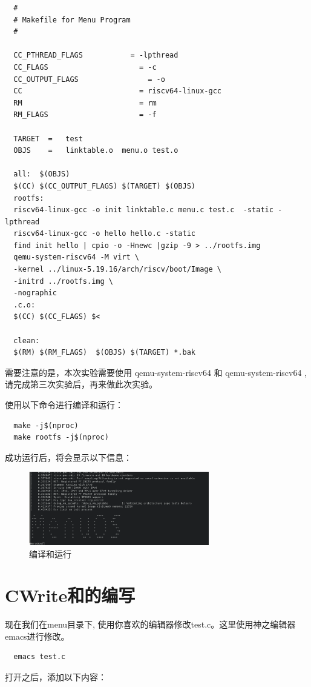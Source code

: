 \documentclass[lang=cn,10pt]{elegantbook}
\begin{document}
\begin{lstlisting}
  #
  # Makefile for Menu Program
  #

  CC_PTHREAD_FLAGS			 = -lpthread
  CC_FLAGS                     = -c 
  CC_OUTPUT_FLAGS				 = -o
  CC                           = riscv64-linux-gcc
  RM                           = rm
  RM_FLAGS                     = -f

  TARGET  =   test
  OBJS    =   linktable.o  menu.o test.o

  all:	$(OBJS)
  $(CC) $(CC_OUTPUT_FLAGS) $(TARGET) $(OBJS) 
  rootfs:
  riscv64-linux-gcc -o init linktable.c menu.c test.c  -static -lpthread
  riscv64-linux-gcc -o hello hello.c -static
  find init hello | cpio -o -Hnewc |gzip -9 > ../rootfs.img
  qemu-system-riscv64 -M virt \
  -kernel ../linux-5.19.16/arch/riscv/boot/Image \
  -initrd ../rootfs.img \
  -nographic
  .c.o:
  $(CC) $(CC_FLAGS) $<

  clean:
  $(RM) $(RM_FLAGS)  $(OBJS) $(TARGET) *.bak
\end{lstlisting}
需要注意的是，本次实验需要使用 qemu-system-riscv64 和 qemu-system-riscv64 , 请完成第三次实验后，再来做此次实验。

使用以下命令进行编译和运行：

\begin{lstlisting}
  make -j$(nproc)
  make rootfs -j$(nproc)
\end{lstlisting}
成功运行后，将会显示以下信息：
\begin{figure}[htbp]
  \centering
  \includegraphics[width=0.7\textwidth]{image/image-20231105212015685.png}
  \caption{编译和运行}
\end{figure}


\section{CWrite和的编写}
现在我们在menu目录下, 使用你喜欢的编辑器修改test.c。这里使用神之编辑器emacs进行修改。

\begin{lstlisting}
  emacs test.c
\end{lstlisting}
打开之后，添加以下内容：
\end{document}
